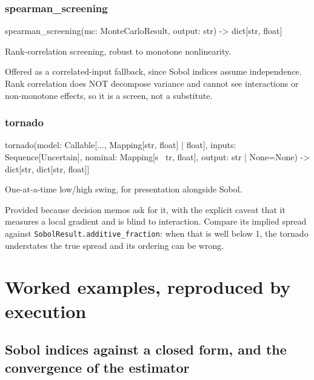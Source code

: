 \documentclass[10pt,a4paper,twoside]{report}
\begin{document}
\subsubsection*{spearman\_screening}

\begin{verbatimsmall}
spearman_screening(mc: MonteCarloResult, output: str) -> dict[str, float]
\end{verbatimsmall}

Rank-correlation screening, robust to monotone nonlinearity.

Offered as a correlated-input fallback, since Sobol indices assume independence. Rank correlation does NOT decompose variance and cannot see interactions or non-monotone effects, so it is a screen, not a substitute.

\subsubsection*{tornado}

\begin{verbatimsmall}
tornado(model: Callable[..., Mapping[str, float] | float], inputs: Sequence[Uncertain], nominal: Mapping[s
    \ tr, float], output: str | None=None) -> dict[str, dict[str, float]]
\end{verbatimsmall}

One-at-a-time low/high swing, for presentation alongside Sobol.

Provided because decision memos ask for it, with the explicit caveat that it measures a local gradient and is blind to interaction. Compare its implied spread against \texttt{SobolResult.additive\_fraction}: when that is well below 1, the tornado understates the true spread and its ordering can be wrong.

\section{Worked examples, reproduced by execution}

\subsection*{Sobol indices against a closed form, and the convergence of the estimator}
\end{document}
